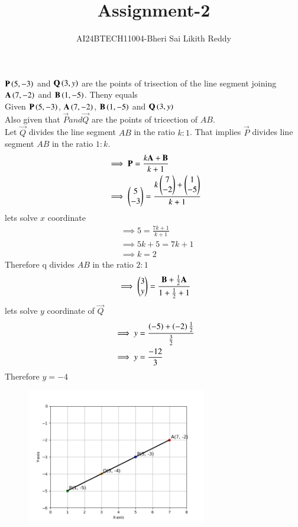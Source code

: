 \documentclass[journal]{IEEEtran}
\begin{document}

\onecolumn
\newpage
\title{Assignment-2}
\author{AI24BTECH11004-Bheri Sai Likith Reddy}
\maketitle
 $\mathbf{P}\left(5,-3\right)$ and $\mathbf{Q}\left(3,y\right)$ are the points of trisection of the line segment joining $\mathbf{A}\left(7,-2\right)$ and $\mathbf{B}\left(1,-5\right)$. Theny equals\\
\solution Given $\mathbf{P}\left(5,-3\right)$, $\mathbf{A}\left(7,-2\right)$, $\mathbf{B}\left(1,-5\right)$ and $\mathbf{Q}\left(3,y\right)$\\
Also given that $\vec{P} and \vec{Q} $ are the points of tricection of $AB$.\\
Let $\vec{Q}$ divides the line segment $AB$ in the ratio $k:1$.
That implies $\vec{P}$ divides line segment $AB$ in the ratio $1:k$.
\begin{align*}
	&\implies \mathbf{P}= \frac{k\mathbf{A} +\mathbf{B}}{k+1}\\
	&\implies \begin{pmatrix}5\\ -3\end{pmatrix}=\frac{k\begin{pmatrix}7\\ -2\end{pmatrix}+\begin{pmatrix}1\\ -5\end{pmatrix}}{k+1}\\
\end{align*}
lets solve $x$ coordinate
\begin{align*}
	&\implies 5=\frac{7k+1}{k+1}\\
	&\implies 5k+5=7k+1\\
	&\implies k=2
\end{align*}
Therefore q divides $AB$ in the ratio $2:1$\\
\begin{align*}
	&\implies \begin{pmatrix}3\\ y\end{pmatrix}=\frac{\mathbf{B} +\frac{1}{2}\mathbf{A} }{1+\frac{1}{2}+1 }\\
\end{align*}
lets solve $y$ coordinate of $\vec{Q}$ 
\begin{align*}
	&\implies y=\frac{\left(-5\right)+\left(-2\right)\frac{1}{2}}{\frac{3}{2}}\\
	&\implies y=\frac{-12}{3}
\end{align*}
Therefore $y=-4$
\begin{figure}[h]
    \centering
    \includegraphics[width=0.7\textwidth]{Fig/Figure_1.png}
\end{figure}
\end{document}
